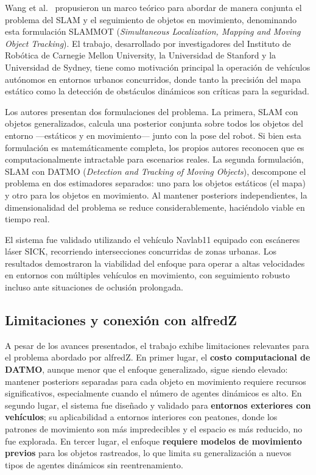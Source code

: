 Wang et al.~\cite{wang2007slammot} propusieron un marco teórico para
abordar de manera conjunta el problema del SLAM y el seguimiento de objetos
en movimiento, denominando esta formulación SLAMMOT (\textit{Simultaneous
Localization, Mapping and Moving Object Tracking}). El trabajo,
desarrollado por investigadores del Instituto de Robótica de Carnegie Mellon
University, la Universidad de Stanford y la Universidad de Sydney, tiene
como motivación principal la operación de vehículos autónomos en entornos
urbanos concurridos, donde tanto la precisión del mapa estático como la
detección de obstáculos dinámicos son críticas para la seguridad.

Los autores presentan dos formulaciones del problema. La primera, SLAM con
objetos generalizados, calcula una posterior conjunta sobre todos los objetos
del entorno ---estáticos y en movimiento--- junto con la pose del robot. Si
bien esta formulación es matemáticamente completa, los propios autores
reconocen que es computacionalmente intractable para escenarios reales. La
segunda formulación, SLAM con DATMO (\textit{Detection and Tracking of
Moving Objects}), descompone el problema en dos estimadores separados: uno
para los objetos estáticos (el mapa) y otro para los objetos en movimiento.
Al mantener posteriors independientes, la dimensionalidad del problema se
reduce considerablemente, haciéndolo viable en tiempo real.

El sistema fue validado utilizando el vehículo Navlab11 equipado con
escáneres láser SICK, recorriendo intersecciones concurridas de zonas
urbanas. Los resultados demostraron la viabilidad del enfoque para operar a
altas velocidades en entornos con múltiples vehículos en movimiento, con
seguimiento robusto incluso ante situaciones de oclusión prolongada.

\subsection{Limitaciones y conexión con alfredZ}

A pesar de los avances presentados, el trabajo exhibe limitaciones relevantes
para el problema abordado por alfredZ. En primer lugar, el \textbf{costo
computacional de DATMO}, aunque menor que el enfoque generalizado, sigue
siendo elevado: mantener posteriors separadas para cada objeto en movimiento
requiere recursos significativos, especialmente cuando el número de agentes
dinámicos es alto. En segundo lugar, el sistema fue diseñado y validado para
\textbf{entornos exteriores con vehículos}; su aplicabilidad a entornos
interiores con peatones, donde los patrones de movimiento son más
impredecibles y el espacio es más reducido, no fue explorada. En tercer
lugar, el enfoque \textbf{requiere modelos de movimiento previos} para los
objetos rastreados, lo que limita su generalización a nuevos tipos de agentes
dinámicos sin reentrenamiento.

